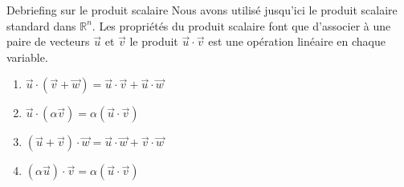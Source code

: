         \begin{parag}{Debriefing sur le produit scalaire}
            Nous avons utilisé jusqu'ici le produit scalaire standard dans $\mathbb{R}^n$. Les propriétés du produit scalaire font que d'associer à une paire de vecteurs $\vec{u}$ et $\vec{v}$ le produit $\vec{u}\cdot \vec{v}$ est une opération linéaire en chaque variable.
            \begin{enumerate}
                \item $\vec{u}\cdot(\vec{v}+\vec{w}) = \vec{u}\cdot\vec{v} + \vec{u}\cdot\vec{w}$
                \item $\vec{u}\cdot(\alpha\vec{v}) = \alpha(\vec{u}\cdot \vec{v})$
                \item $(\vec{u}+\vec{v}) \cdot \vec{w} = \vec{u}\cdot\vec{w} + \vec{v}\cdot \vec{w}$
                \item $(\alpha\vec{u})\cdot \vec{v} = \alpha(\vec{u}\cdot\vec{v})$
            \end{enumerate}
        \end{parag}
